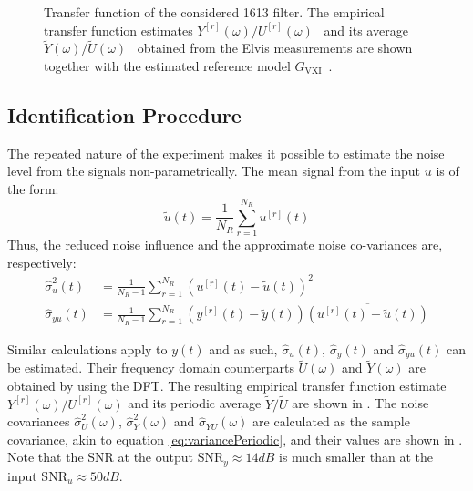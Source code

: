\begin{figure}
  \centering
  \setlength{\figurewidth}{0.75\columnwidth}
  \setlength{\figureheight}{0.68\figurewidth}
  
  \caption[\BK{} 1613 filter transfer function]{Transfer function of the considered \BK{} 1613 filter.
  The empirical transfer function estimates $Y^{[r]}(\omega)/U^{[r]}(\omega)$~ and its average $\tilde{Y}(\omega)/\tilde{U}(\omega)$~ obtained from the Elvis measurements are shown together with the estimated reference model $G_{\mathrm{VXI}}$~.} 
  \label{fig:bk1613}
\end{figure}


\subsection{Identification Procedure}
The repeated nature of the experiment makes it possible to estimate the noise level from the signals non-parametrically.
The mean signal from the input $u$ is of the form:
\begin{equation}
  \tilde{u}(t) = \frac{1}{N_R} \sum_{r=1}^{N_R} u^{[r]}(t)
\end{equation}
Thus, the reduced noise influence and the approximate noise co-variances are, respectively:
\begin{align}
  \hat\sigma_{u}^2(t) &= \frac{1}{N_R - 1} 
                    \sum_{r=1}^{N_R} 
                    \left( u^{[r]}(t) - \tilde{u}(t) \right)^2 \\
  \hat\sigma_{yu}(t) &= \frac{1}{N_R - 1} 
                    \sum_{r=1}^{N_R} 
                    \left( y^{[r]}(t) - \tilde{y}(t) \right)
                    \overline{\left( u^{[r]}(t) - \tilde{u}(t) \right)}
  \label{eq:variancePeriodic}            
\end{align}
 
Similar calculations apply to $y(t)$ and as such, $\hat\sigma_u(t)$, $\hat\sigma_y(t)$ and $\hat\sigma_{yu}(t)$ can be estimated.
Their frequency domain counterparts $\tilde{U}(\omega)$ and $\tilde{Y}(\omega)$ are obtained by using the DFT.
The resulting empirical transfer function estimate $Y^{[r]}(\omega)/U^{[r]}(\omega)$ and its periodic average $\tilde{Y}/\tilde{U}$ are shown in .
The noise covariances $\hat\sigma^2_{U}(\omega)$, $\hat\sigma^2_{Y}(\omega)$ and  $\hat\sigma_{YU}(\omega)$ are calculated as the sample covariance, akin to equation \eqref{eq:variancePeriodic}, and their values are shown in .
Note that the SNR at the output $\mathrm{SNR}_{y} \approx 14 \unit{dB}$ is much smaller than at the input $\mathrm{SNR}_{u} \approx 50 \unit{dB}$.

